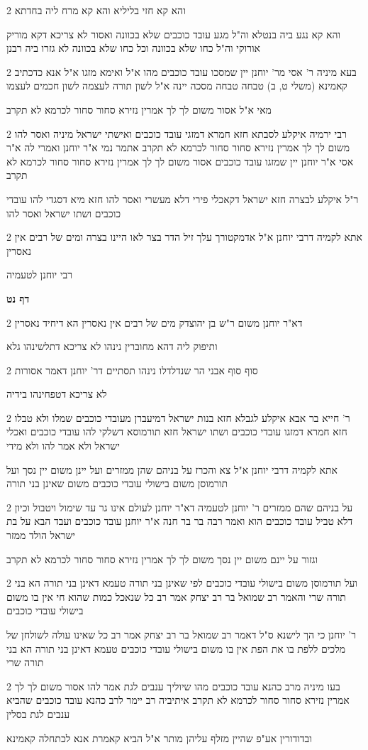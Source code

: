 \documentclass[12pt, openany]{book}
\newcommand{\sethebfont}{
\fontsize{10.5pt}{21.0pt} \selectfont
}
\newcommand{\twocol}[1]{
	{\sethebfont \begin{multicols}{2}
			#1
	\end{multicols}}	
}
\newcommand{\sectname}{}
\newcommand{\newsection}[1]{
	\addcontentsline{toc}{section}{#1}
	\renewcommand{\sectname}{#1}	
	\vspace{-\baselineskip}
	\begin{center}
		\textbf{%
\fontsize{16pt}{16pt}\selectfont
			#1}
	\end{center}
	\vspace{-\baselineskip}
	\nopagebreak
}
\begin{document}
\twocol{והא קא חזי בליליא והא קא מרח ליה בחדתא
\par והא קא נגע ביה בנטלא וה"ל מגע עובד כוכבים שלא בכוונה ואסור לא צריכא דקא מוריק אורוקי וה"ל כחו שלא בכוונה וכל כחו שלא בכוונה לא גזרו ביה רבנן}
\twocol{בעא מיניה ר' אסי מר' יוחנן יין שמסכו עובד כוכבים מהו א"ל ואימא מזגו א"ל אנא כדכתיב קאמינא (משלי ט, ב) טבחה טבחה מסכה יינה א"ל לשון תורה לעצמה לשון חכמים לעצמו
\par מאי א"ל אסור משום לך לך אמרין נזירא סחור סחור לכרמא לא תקרב}
\twocol{רבי ירמיה איקלע לסבתא חזא חמרא דמזגי עובד כוכבים ואישתי ישראל מיניה ואסר להו משום לך לך אמרין נזירא סחור סחור לכרמא לא תקרב אתמר נמי א"ר יוחנן ואמרי לה א"ר אסי א"ר יוחנן יין שמזגו עובד כוכבים אסור משום לך לך אמרין נזירא סחור סחור לכרמא לא תקרב
\par ר"ל איקלע לבצרה חזא ישראל דקאכלי פירי דלא מעשרי ואסר להו חזא מיא דסגדי להו עובדי כוכבים ושתו ישראל ואסר להו}
\twocol{אתא לקמיה דרבי יוחנן א"ל אדמקטורך עלך זיל הדר בצר לאו היינו בצרה ומים של רבים אין נאסרין
\par רבי יוחנן לטעמיה}
\newsection{דף נט}
\twocol{דא"ר יוחנן משום ר"ש בן יהוצדק מים של רבים אין נאסרין הא דיחיד נאסרין
\par ותיפוק ליה דהא מחוברין נינהו לא צריכא דתלשינהו גלא}
\twocol{סוף סוף אבני הר שנדלדלו נינהו תסתיים דר' יוחנן דאמר אסורות
\par לא צריכא דטפחינהו בידיה}
\twocol{ר' חייא בר אבא איקלע לגבלא חזא בנות ישראל דמיעברן מעובדי כוכבים שמלו ולא טבלו חזא חמרא דמזגו עובדי כוכבים ושתו ישראל חזא תורמוסא דשלקי להו עובדי כוכבים ואכלי ישראל ולא אמר להו ולא מידי
\par אתא לקמיה דרבי יוחנן א"ל צא והכרז על בניהם שהן ממזרים ועל יינן משום יין נסך ועל תורמוסן משום בישולי עובדי כוכבים משום שאינן בני תורה}
\twocol{על בניהם שהם ממזרים ר' יוחנן לטעמיה דא"ר יוחנן לעולם אינו גר עד שימול ויטבול וכיון דלא טביל עובד כוכבים הוא ואמר רבה בר בר חנה א"ר יוחנן עובד כוכבים ועבד הבא על בת ישראל הולד ממזר
\par וגזור על יינם משום יין נסך משום לך לך אמרין נזירא סחור סחור לכרמא לא תקרב}
\twocol{ועל תורמוסן משום בישולי עובדי כוכבים לפי שאינן בני תורה טעמא דאינן בני תורה הא בני תורה שרי והאמר רב שמואל בר רב יצחק אמר רב כל שנאכל כמות שהוא חי אין בו משום בישולי עובדי כוכבים
\par ר' יוחנן כי הך לישנא ס"ל דאמר רב שמואל בר רב יצחק אמר רב כל שאינו עולה לשולחן של מלכים ללפת בו את הפת אין בו משום בישולי עובדי כוכבים טעמא דאינן בני תורה הא בני תורה שרי}
\twocol{בעו מיניה מרב כהנא עובד כוכבים מהו שיוליך ענבים לגת אמר להו אסור משום לך לך אמרין נזירא סחור סחור לכרמא לא תקרב איתיביה רב יימר לרב כהנא עובד כוכבים שהביא ענבים לגת בסלין
\par ובדודורין אע"פ שהיין מזלף עליהן מותר א"ל הביא קאמרת אנא לכתחלה קאמינא}
\end{document}
